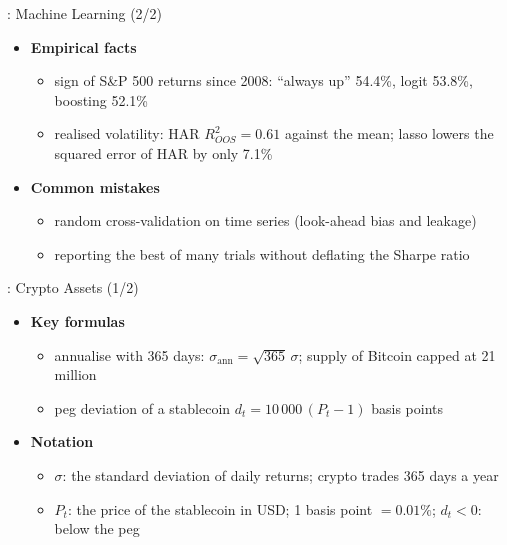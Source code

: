 \begin{frame}{: Machine Learning (2/2)}
\itemsize{\small}
\begin{itemize}
    \item \textbf{Empirical facts}
    \begin{itemize}
        \item sign of S\&P 500 returns since 2008: ``always up'' 54.4\%, logit 53.8\%, boosting 52.1\%
        \item realised volatility: HAR $R^2_{OOS} = 0.61$ against the mean; lasso lowers the squared error of HAR by only 7.1\%
    \end{itemize}
    \item \textbf{Common mistakes}
    \begin{itemize}
        \item random cross-validation on time series (look-ahead bias and leakage)
        \item reporting the best of many trials without deflating the Sharpe ratio
    \end{itemize}
\end{itemize}
\end{frame}

\begin{frame}{: Crypto Assets (1/2)}
\itemsize{\small}
\begin{itemize}
    \item \textbf{Key formulas}
    \begin{itemize}
        \item annualise with 365 days: $\sigma_{\text{ann}} = \sqrt{365}\,\sigma$; supply of Bitcoin capped at 21 million 
        \item peg deviation of a stablecoin $d_t = 10\,000\,(P_t - 1)$ basis points
    \end{itemize}
    \item \textbf{Notation}
    \begin{itemize}
        \item $\sigma$: the standard deviation of daily returns; crypto trades 365 days a year
        \item $P_t$: the price of the stablecoin in USD; 1 basis point $= 0.01\%$; $d_t < 0$: below the peg
    \end{itemize}
\end{itemize}
\end{frame}

